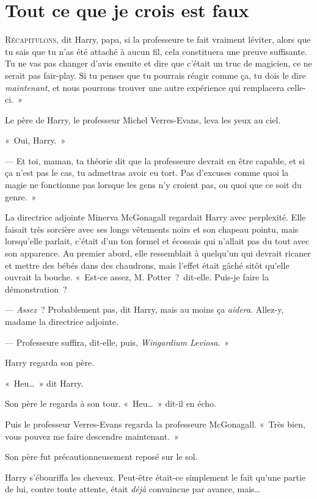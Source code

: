\chapter{Tout ce que je crois est faux}

\lettrine[ante=«~]{R}{écapitulons}, dit Harry, papa, si la professeure te fait vraiment léviter, alors que tu sais que tu n'as été attaché à aucun fil, cela constituera une preuve suffisante. Tu ne vas pas changer d'avis ensuite et dire que c'était un truc de magicien, ce ne serait pas fair-play. Si tu penses que tu pourrais réagir comme ça, tu dois le dire \emph{maintenant}, et nous pourrons trouver une autre expérience qui remplacera celle-ci.~»

Le père de Harry, le professeur Michel Verres-Evans, leva les yeux au ciel.

«~Oui, Harry.~»

--- Et toi, maman, ta théorie dit que la professeure devrait en être capable, et si ça n'est pas le cas, tu admettras avoir eu tort. Pas d'excuses comme quoi la magie ne fonctionne pas lorsque les gens n'y croient pas, ou quoi que ce soit du genre.~»

La directrice adjointe Minerva McGonagall regardait Harry avec perplexité. Elle faisait très sorcière avec ses longs vêtements noirs et son chapeau pointu, mais lorsqu'elle parlait, c'était d'un ton formel et écossais qui n'allait pas du tout avec son apparence. Au premier abord, elle ressemblait à quelqu'un qui devrait ricaner et mettre des bébés dans des chaudrons, mais l'effet était gâché sitôt qu'elle ouvrait la bouche. «~Est-ce assez, M. Potter~?~dit-elle. Puis-je faire la démonstration~?

--- \emph{Assez}~? Probablement pas, dit Harry, mais au moins ça \emph{aidera}. Allez-y, madame la directrice adjointe.

--- Professeure suffira, dit-elle, puis, \emph{Wingardium Leviosa}.~»

Harry regarda son père.

«~Heu…~» dit Harry.

Son père le regarda à son tour. «~Heu…~» dit-il en écho.

Puis le professeur Verres-Evans regarda la professeure McGonagall.  «~Très bien, vous pouvez me faire descendre maintenant.~»

Son père fut précautionneusement reposé sur le sol.

Harry s'ébouriffa les cheveux. Peut-être était-ce simplement le fait qu'une partie de lui, contre toute attente, était \emph{déjà} convaincue par avance, mais…

